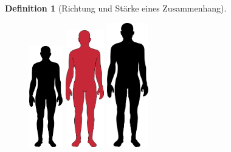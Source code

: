 \documentclass[
  a4paper,
  DIV=11]{scrreprt}
\theoremstyle{definition}
\theoremstyle{definition}
\theoremstyle{definition}
\newtheorem{definition}{Definition}[chapter]
\theoremstyle{remark}
\begin{document}
\begin{definition}[Richtung und Stärke eines
Zusammenhang]
\begin{figure}
\begin{minipage}{0.20\linewidth}
\end{minipage}%
%
\begin{minipage}{0.20\linewidth}

\includegraphics[width=0.13\textwidth,height=\textheight]{img/Human_Silhouette.svg.png}

\end{minipage}%
%
\begin{minipage}{0.20\linewidth}

\includegraphics[width=0.15\textwidth,height=\textheight]{img/human-red.png}

\end{minipage}%
%
\begin{minipage}{0.20\linewidth}

\includegraphics[width=0.16\textwidth,height=\textheight]{img/Human_Silhouette.svg.png}


\end{minipage}
\end{figure}
\end{definition}
\end{document}

